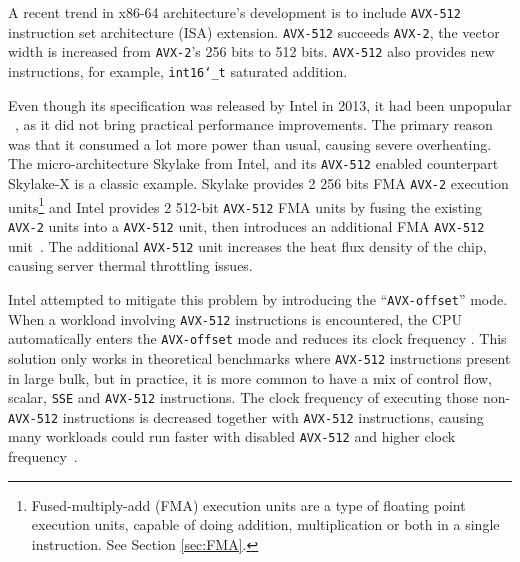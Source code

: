 \documentclass[logo,bsc,singlespacing,parskip]{infthesis}
\newcommand{\dtshort}{\texttt{int16\char`_t}}
\newcommand{\hlc}[2][yellow]{{%
    \colorlet{foo}{#1}%
    \sethlcolor{foo}\hl{#2}}%
}
\begin{document}
A recent trend in x86-64 architecture’s development is to include \texttt{AVX-512}
instruction set architecture (ISA) extension. \texttt{AVX-512} succeeds \texttt{AVX-2}, the vector
width is increased from \texttt{AVX-2}’s 256 bits to 512 bits. \texttt{AVX-512} also provides new
instructions, for example, \dtshort{} saturated addition.


Even though its specification was released by Intel in 2013, it had been
unpopular ~\cite{linusHopeAvx512Die}, as it did not bring practical performance
improvements. The primary reason was that it consumed a lot more power than
usual, causing severe overheating. The micro-architecture Skylake from Intel,
and its \texttt{AVX-512} enabled counterpart Skylake-X is a classic example.
Skylake provides 2 256 bits FMA \texttt{AVX-2} execution units\footnote{Fused-multiply-add (FMA) execution units are a type of floating point
execution units, capable of doing addition, multiplication or both in a single
instruction. See Section \ref{sec:FMA}.} and Intel provides 2 512-bit
\texttt{AVX-512} FMA units by fusing the existing \texttt{AVX-2}  units into a
\texttt{AVX-512} unit, then introduces an additional FMA \texttt{AVX-512}
unit~\cite{SLK-X}. The additional \texttt{AVX-512} unit increases the heat flux
density of the chip, causing server thermal throttling issues. 

Intel attempted to mitigate this problem by introducing the
``\texttt{AVX-offset}'' mode. When a workload involving \texttt{AVX-512}
instructions is encountered, the CPU automatically enters the
\texttt{AVX-offset} mode and reduces its clock frequency \cite{AVX-offset}. This
solution only works in theoretical benchmarks where \texttt{AVX-512}
instructions present in large bulk, but in practice, it is more common to have a
mix of control flow, scalar, \texttt{SSE} and \texttt{AVX-512} instructions. The
clock frequency of executing those non-\texttt{AVX-512} instructions is
decreased together with \texttt{AVX-512} instructions, causing many workloads
could run faster with disabled \texttt{AVX-512} and higher clock
frequency~\cite{Zen4Critique}. 

\end{document}
